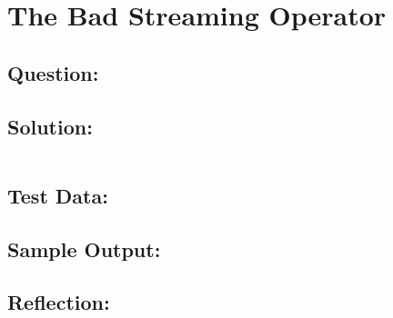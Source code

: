 \documentclass[Lab-B.tex]{subfiles}
\begin{document}
    \section{The Bad Streaming Operator}
        \subsection*{Question:}
            
        \subsection*{Solution:}
            \inputminted{cpp}{}%

        \subsection*{Test Data:}
        
        \subsection*{Sample Output:}

        \subsection*{Reflection:}
\end{document}
